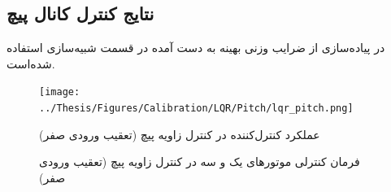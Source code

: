\documentclass{CCI2020}
\begin{document}
	
	\subsection{نتایج کنترل کانال پیچ}\label{roll_lqr_section}
	در پیاده‌سازی از ضرایب وزنی بهینه به دست آمده در قسمت شبیه‌سازی استفاده شده‌است.
	\begin{figure}[H]
		\texttt{[image: ../Thesis/Figures/Calibration/LQR/Pitch/lqr\_pitch.png]}
		\centering
		\caption{عملكرد کنترل‌کننده  در کنترل زاويه پیچ (تعقیب ورودی صفر)}
	\end{figure}
	\begin{figure}[H]
		\centering
		\caption{فرمان کنترلی موتورهای یک و سه در کنترل زاویه پیچ (تعقیب ورودی صفر)}
	\end{figure}
	
\end{document}
